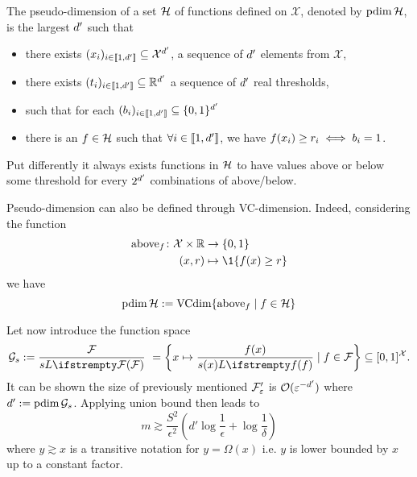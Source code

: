 \begin{tcolorbox}
	\begin{definition}
        \label{def__pseudodim}
		The pseudo-dimension of a set $\mathcal{H}$ of functions defined on $\mathcal{X}$, denoted by $\operatorname{pdim}\mathcal{H}$, is the largest ${d'}$ such that 
	\begin{itemize}
		\item there exists $(x_{i})_{i\in \llbracket 1,{d'} \rrbracket} \subseteq \mathcal{X}^{d'}$, a sequence of ${d'}$ elements from $\mathcal{X}$,
		\item there exists $(t_i)_{i\in \llbracket 1,{d'} \rrbracket} \subseteq  \mathbb{R}^{d'}$ a sequence of ${d'}$ real thresholds,
		\item such that for each $(b_i)_{i\in \llbracket 1,{d'} \rrbracket} \subseteq \{0,1\}^{d'}$
		\item there is an $f \in \mathcal{H}$ such that $\forall i \in \llbracket 1,{d'} \rrbracket$, we have $f(x_i) \geq r_i \iff b_i = 1$. 
	\end{itemize}
	Put differently it always exists functions in $\mathcal{H}$ to have values above or below some threshold for every $2^{d'}$ combinations of above/below.
\end{definition}
Pseudo-dimension can also be defined through VC-dimension. Indeed, considering the function
\begin{align*}
	\operatorname{above}_\query \colon \mathcal{X} \times \RR &\to \{0,1\}\\
	(x,r) &\mapsto \1\{f(x) \geq r\}
\end{align*}
we have
\begin{equation}
	\operatorname{pdim}\mathcal{H} := \operatorname{VCdim}\{\operatorname{above}_f \mid f \in \mathcal{H}\}
\end{equation}
\end{tcolorbox}

Let now introduce the function space
\begin{equation}
    \label{eqn__g_sensitivity}
    \twoqset_s := \frac{\qset}{s\loss{\qset}} \ =\left\{x \mapsto \frac{\query(x)}{s(x)\loss{\query}} \mid \query \in \qset\right\} \subseteq [0,1]^{\mathcal{X}}.
\end{equation}
It can be shown the size of previously mentioned $\mathcal{F}'_\varepsilon$ is $\mathcal{O}(\varepsilon^{-{d'}})$ where ${d'}:=\operatorname{pdim}\mathcal{G}_s$. Applying union bound then leads to
\begin{equation*}
	m \gtrsim \frac{S^{2}}{\epsilon^{2}} (d'\log\frac{1}{\epsilon} + \log \frac{1}{\delta})
\end{equation*}
where $y \gtrsim x$ is a transitive notation for $y = \Omega(x)$ i.e. $y$ is lower bounded by $x$ up to a constant factor. 

